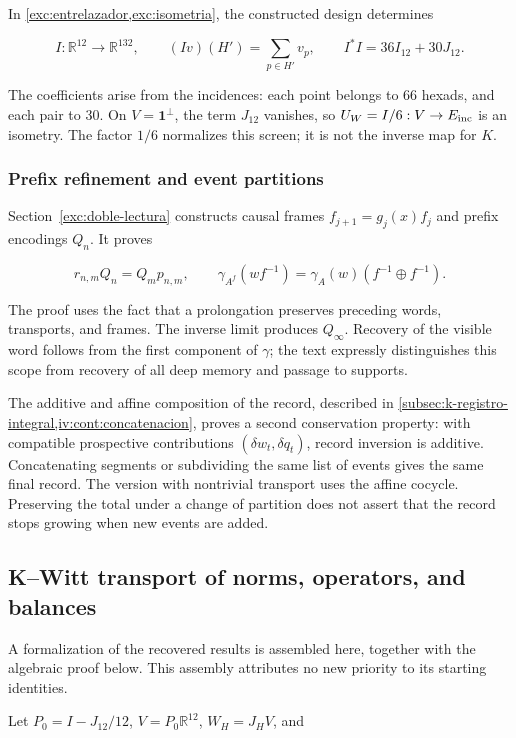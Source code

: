 In \cref{exc:entrelazador,exc:isometria}, the constructed design determines

\[
I:\mathbb R^{12}\to\mathbb R^{132},\qquad
(Iv)(H')=\sum_{p\in H'}v_p,\qquad I^*I=36I_{12}+30J_{12}.
\]

The coefficients arise from the incidences: each point belongs to 66 hexads, and each pair to 30. On \(V=\mathbf1^\perp\), the term \(J_{12}\) vanishes, so \(U_W=I/6:V\to E_{\rm inc}\) is an isometry. The factor \(1/6\) normalizes this screen; it is not the inverse map for \(K\).

\subsubsection{Prefix refinement and event partitions}

Section~\ref{exc:doble-lectura} constructs causal frames \(f_{j+1}=g_j(x)f_j\) and prefix encodings \(Q_n\). It proves

\[
r_{n,m}Q_n=Q_mp_{n,m},\qquad
\gamma_{A^f}(wf^{-1})=\gamma_A(w)(f^{-1}\oplus f^{-1}).
\]

The proof uses the fact that a prolongation preserves preceding words, transports, and frames. The inverse limit produces \(Q_\infty\). Recovery of the visible word follows from the first component of \(\gamma\); the text expressly distinguishes this scope from recovery of all deep memory and passage to supports.

The additive and affine composition of the record, described in \cref{subsec:k-registro-integral,iv:cont:concatenacion}, proves a second conservation property: with compatible prospective contributions \((\delta w_t,\delta q_t)\), record inversion is additive. Concatenating segments or subdividing the same list of events gives the same final record. The version with nontrivial transport uses the affine cocycle. Preserving the total under a change of partition does not assert that the record stops growing when new events are added.

\subsection{K–Witt transport of norms, operators, and balances}\label{nuc04:kwitt}

A formalization of the recovered results is assembled here, together with the algebraic proof below. This assembly attributes no new priority to its starting identities.

Let \(P_0=I-J_{12}/12\), \(V=P_0\mathbb R^{12}\), \(W_H=J_HV\), and

